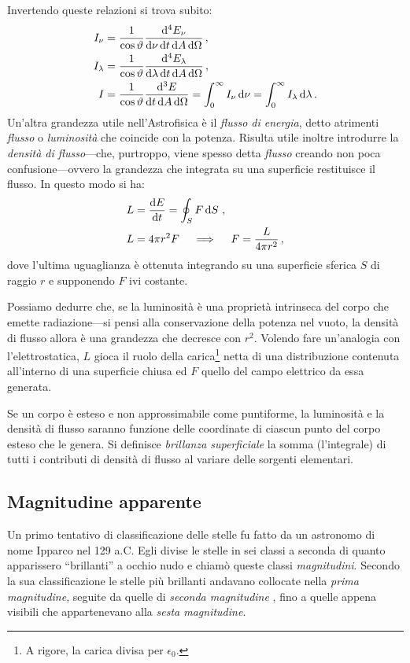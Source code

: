     Invertendo queste relazioni si trova subito:
    \begin{align}
        I_\nu &= \frac{1}{\cos\vartheta}\frac{\dd[4] E_\nu}{\dd{\nu} \dd{t} \dd{A} \dd{\Omega}} \,, \\
        I_\lambda &= \frac{1}{\cos\vartheta}\frac{\dd[4] E_\lambda}{\dd{\lambda} \dd{t} \dd{A} \dd{\Omega}}
        \,, \\
        I &= \frac{1}{\cos\vartheta}\frac{\dd[3] E}{\dd t \dd{A} \dd{\Omega}}
        = \int_{0}^{\infty}I_\nu \,\dd\nu
        = \int_{0}^{\infty}I_\lambda \,\dd\lambda
        \,.
    \end{align}
    Un'altra grandezza utile nell'Astrofisica è il \emph{flusso di energia}, detto atrimenti \emph{flusso} o \emph{luminosità} che coincide con la potenza. Risulta utile inoltre introdurre la \emph{densità di flusso}---che, purtroppo, viene spesso detta \emph{flusso} creando non poca confusione---ovvero la grandezza che integrata su una superficie restituisce il flusso. In questo modo si ha:
    \begin{align}
        \label{eq:lumin-1}
        L &= \dv{E}{t} = \oint\nolimits_{S} F\dd{S} \,, \\
        \label{eq:lumin-2}
        L &= 4\pi r^2 F \quad \implies \quad F = \frac{L}{4\pi r^2}
        \,,
    \end{align}
    dove l'ultima uguaglianza è ottenuta integrando su una superficie sferica $S$ di raggio $r$ e supponendo $F$ ivi costante.

    Possiamo dedurre che, se la luminosità è una proprietà intrinseca del corpo che emette radiazione---si pensi alla conservazione della potenza nel vuoto, la densità di flusso allora è una grandezza che decresce con $r^2$. Volendo fare un'analogia con l'elettrostatica, $L$ gioca il ruolo della carica\footnote{A rigore, la carica divisa per $\epsilon_{0}$.} netta di una distribuzione contenuta all'interno di una superficie chiusa ed $F$ quello del campo elettrico da essa generata.

    Se un corpo è esteso e non approssimabile come puntiforme, la luminosità e la densità di flusso saranno funzione delle coordinate di ciascun punto del corpo esteso che le genera. Si definisce \emph{brillanza superficiale} la somma (l'integrale) di tutti i contributi di densità di flusso al variare delle sorgenti elementari.
    \subsection{Magnitudine apparente}
        Un primo tentativo di classificazione delle stelle fu fatto da un astronomo di nome Ipparco nel 129 a.C. Egli divise le stelle in sei classi a seconda di quanto apparissero ``brillanti'' a occhio nudo e chiamò queste classi \emph{magnitudini}. Secondo la sua classificazione le stelle più brillanti andavano collocate nella \emph{prima magnitudine}, seguite da quelle di \emph{seconda magnitudine} \myetc, fino a quelle appena visibili che appartenevano alla \emph{sesta magnitudine}.

